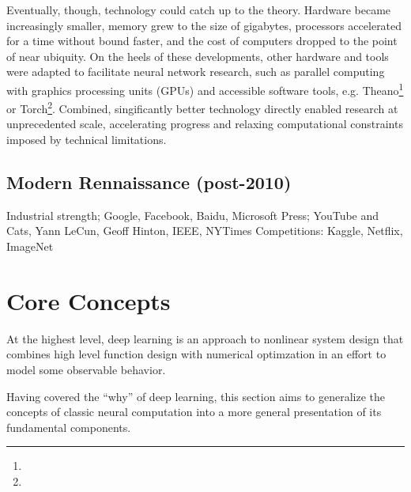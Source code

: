 Eventually, though, technology could catch up to the theory.
Hardware became increasingly smaller, memory grew to the size of gigabytes, processors accelerated for a time without bound faster, and the cost of computers dropped to the point of near ubiquity.
On the heels of these developments, other hardware and tools were adapted to facilitate neural network research, such as parallel computing with graphics processing units (GPUs) and accessible software tools, e.g. Theano\footnote{} or Torch\footnote{}.
Combined, singificantly better technology directly enabled research at unprecedented scale, accelerating progress and relaxing computational constraints imposed by technical limitations.



\subsection{Modern Rennaissance (post-2010)}
\label{subsec:rennaissance}

Industrial strength; Google, Facebook, Baidu, Microsoft
Press; YouTube and Cats, Yann LeCun, Geoff Hinton, IEEE, NYTimes
Competitions: Kaggle, Netflix, ImageNet


\section{Core Concepts}
\label{sec:example}

At the highest level, deep learning is an approach to nonlinear system design that combines high level function design with numerical optimzation in an effort to model some observable behavior.


Having covered the ``why'' of deep learning, this section aims to generalize the concepts of classic neural computation into a more general presentation of its fundamental components.



